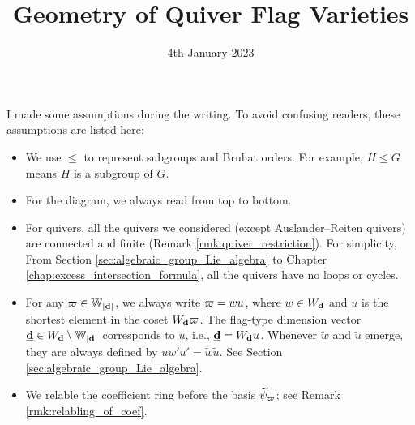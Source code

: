 \date{4th January 2023}


\title{Geometry of Quiver Flag Varieties}

\maketitle
\tableofcontents

\begin{warning}
I made some assumptions during the writing. To avoid confusing readers, these assumptions are listed here:
\begin{itemize}
\item We use $\leqslant$ to represent subgroups and Bruhat orders. For example, $H \leqslant G$ means $H$ is a subgroup of $G$.

\item For the diagram, we always read from top to bottom.

\item For quivers, all the quivers we considered (except Auslander--Reiten quivers) are connected and finite (Remark \ref{rmk:quiver_restriction}). For simplicity, From Section \ref{sec:algebraic_group_Lie_algebra} to Chapter \ref{chap:excess_intersection_formula}, all the quivers have no loops or cycles.

\item  For any $\varpi \in \mathbb{W}_{|\mathbf{d}|}$, we always write $\varpi = wu$, where $w \in W_{\mathbf{d}}$ and $u$ is the shortest element in the coset $W_{\mathbf{d}} \varpi$. The flag-type dimension vector $\underline{\mathbf{d}} \in W_{\mathbf{d}} \setminus \mathbb{W}_{|\mathbf{d}|}$ corresponds to $u$, i.e., $\underline{\mathbf{d}}=W_{\mathbf{d}} u$. Whenever $\tilde{w}$ and $\tilde{u}$ emerge, they are always defined by $uw'u'=\tilde{w}\tilde{u}$. See Section \ref{sec:algebraic_group_Lie_algebra}. 

\item We relable the coefficient ring before the basis $\widetilde{\psi}_{\varpi}$; see Remark \ref{rmk:relabling_of_coef}.
\end{itemize}
\end{warning}